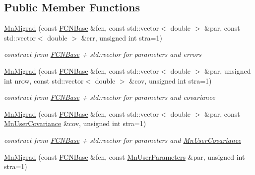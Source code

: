 \subsection*{Public Member Functions}
\begin{DoxyCompactItemize}
\item 
\mbox{\hyperlink{classROOT_1_1Minuit2_1_1MnMigrad_a3a3610c55a91cb68fb3b95506ff08339}{Mn\+Migrad}} (const \mbox{\hyperlink{classROOT_1_1Minuit2_1_1FCNBase}{F\+C\+N\+Base}} \&fcn, const std\+::vector$<$ double $>$ \&par, const std\+::vector$<$ double $>$ \&err, unsigned int stra=1)
\begin{DoxyCompactList}\small\item\em construct from \mbox{\hyperlink{classROOT_1_1Minuit2_1_1FCNBase}{F\+C\+N\+Base}} + std\+::vector for parameters and errors \end{DoxyCompactList}\item 
\mbox{\hyperlink{classROOT_1_1Minuit2_1_1MnMigrad_a72c6740b17d24c92d0a0049d52de778e}{Mn\+Migrad}} (const \mbox{\hyperlink{classROOT_1_1Minuit2_1_1FCNBase}{F\+C\+N\+Base}} \&fcn, const std\+::vector$<$ double $>$ \&par, unsigned int nrow, const std\+::vector$<$ double $>$ \&cov, unsigned int stra=1)
\begin{DoxyCompactList}\small\item\em construct from \mbox{\hyperlink{classROOT_1_1Minuit2_1_1FCNBase}{F\+C\+N\+Base}} + std\+::vector for parameters and covariance \end{DoxyCompactList}\item 
\mbox{\hyperlink{classROOT_1_1Minuit2_1_1MnMigrad_a7830eb76c9d314bc8e101ac34150ccb8}{Mn\+Migrad}} (const \mbox{\hyperlink{classROOT_1_1Minuit2_1_1FCNBase}{F\+C\+N\+Base}} \&fcn, const std\+::vector$<$ double $>$ \&par, const \mbox{\hyperlink{classROOT_1_1Minuit2_1_1MnUserCovariance}{Mn\+User\+Covariance}} \&cov, unsigned int stra=1)
\begin{DoxyCompactList}\small\item\em construct from \mbox{\hyperlink{classROOT_1_1Minuit2_1_1FCNBase}{F\+C\+N\+Base}} + std\+::vector for parameters and \mbox{\hyperlink{classROOT_1_1Minuit2_1_1MnUserCovariance}{Mn\+User\+Covariance}} \end{DoxyCompactList}\item 
\mbox{\hyperlink{classROOT_1_1Minuit2_1_1MnMigrad_a552ce72a98922a75ef921a3cccfe97c1}{Mn\+Migrad}} (const \mbox{\hyperlink{classROOT_1_1Minuit2_1_1FCNBase}{F\+C\+N\+Base}} \&fcn, const \mbox{\hyperlink{classROOT_1_1Minuit2_1_1MnUserParameters}{Mn\+User\+Parameters}} \&par, unsigned int stra=1)

\end{DoxyCompactItemize}
